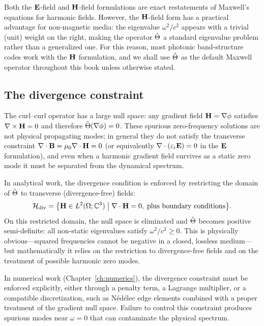 Both the $\mathbf{E}$-field and $\mathbf{H}$-field formulations are exact restatements
of Maxwell's equations for harmonic fields. However, the $\mathbf{H}$-field form
has a practical advantage for non-magnetic media: the eigenvalue
$\omega^2/c^2$ appears with a trivial (unit) weight on the right, making
the operator $\hat{\Theta}$ a standard eigenvalue problem rather than a generalized
one. For this reason, most photonic band-structure codes work with the
$\mathbf{H}$ formulation, and we shall use $\hat{\Theta}$ as the default Maxwell operator
throughout this book unless otherwise stated.

\subsection{The divergence constraint}
\label{ssec:divergence}

The curl--curl operator has a large null space: any gradient field
$\mathbf{H} = \nabla\phi$ satisfies $\nabla\times\mathbf{H} = 0$ and therefore
$\hat{\Theta}(\nabla\phi) = 0$. These spurious zero-frequency solutions are
not physical propagating modes; in general they do not satisfy the
transverse constraint $\nabla\cdot\mathbf{B} = \mu_0\nabla\cdot\mathbf{H} = 0$ (or equivalently
$\nabla\cdot(\varepsilon_{\mathrm{r}}\mathbf{E}) = 0$ in the $\mathbf{E}$ formulation), and even when a harmonic
gradient field survives as a static zero mode it must be separated from
the dynamical spectrum.

In analytical work, the divergence condition is enforced by restricting
the domain of $\hat{\Theta}$ to transverse (divergence-free) fields:
\begin{equation}
 \mathcal{H}_{\mathrm{div}} = \bigl\{
 \mathbf{H} \in L^2(\Omega;\mathbb{C}^3) \;\big|\;
 \nabla\cdot\mathbf{H} = 0,\;\text{plus boundary conditions}
 \bigr\}.
 \label{eq:div-free-space}
\end{equation}
On this restricted domain, the null space is eliminated and $\hat{\Theta}$ becomes
positive semi-definite: all non-static eigenvalues satisfy
$\omega^2/c^2 \ge 0$. This is physically obvious---squared frequencies
cannot be negative in a closed, lossless medium---but mathematically it
relies on the restriction to divergence-free fields and on the treatment
of possible harmonic zero modes.

In numerical work (Chapter~\ref{ch:numerics}), the divergence constraint
must be enforced explicitly, either through a penalty term, a Lagrange
multiplier, or a compatible discretization, such as N\'ed\'elec edge
elements combined with a proper treatment of the gradient null space.
Failure to control this constraint produces spurious modes near
$\omega = 0$ that can contaminate the physical spectrum.


